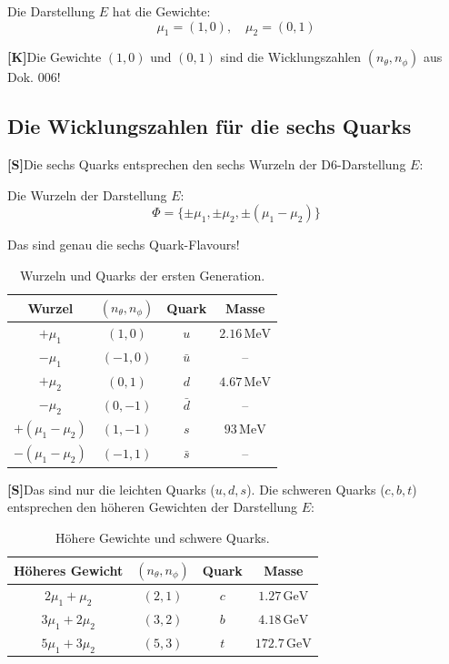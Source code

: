 \documentclass[11pt,a4paper]{article}
\newcommand{\Kstatus}{\textbf{[K]}}
\newcommand{\Sstatus}{\textbf{[S]}}
\begin{document}
	Die Darstellung $E$ hat die Gewichte:
	\begin{equation}
		\mu_1 = (1, 0), \quad \mu_2 = (0, 1)
	\end{equation}
	
	\Kstatus Die Gewichte $(1, 0)$ und $(0, 1)$ sind die Wicklungszahlen $(n_\theta, n_\phi)$ aus Dok. 006!
	
	\subsection{Die Wicklungszahlen für die sechs Quarks}
	
	\Sstatus Die sechs Quarks entsprechen den sechs Wurzeln der D6-Darstellung $E$:
	
	Die Wurzeln der Darstellung $E$:
	\begin{equation}
		\Phi = \{\pm \mu_1, \pm \mu_2, \pm (\mu_1 - \mu_2)\}
	\end{equation}
	
	Das sind genau die sechs Quark-Flavours!
	
	\begin{table}[h!]
		\centering
		\caption{Wurzeln und Quarks der ersten Generation.}
		\label{tab:roots_quarks}
		\begin{tabular}{c c c c}
			\toprule
			\textbf{Wurzel} & $(n_\theta, n_\phi)$ & \textbf{Quark} & \textbf{Masse} \\
			\midrule
			$+\mu_1$ & $(1, 0)$ & $u$ & $2.16\,\text{MeV}$ \\
			$-\mu_1$ & $(-1, 0)$ & $\bar{u}$ & -- \\
			$+\mu_2$ & $(0, 1)$ & $d$ & $4.67\,\text{MeV}$ \\
			$-\mu_2$ & $(0, -1)$ & $\bar{d}$ & -- \\
			$+(\mu_1 - \mu_2)$ & $(1, -1)$ & $s$ & $93\,\text{MeV}$ \\
			$-(\mu_1 - \mu_2)$ & $(-1, 1)$ & $\bar{s}$ & -- \\
			\bottomrule
		\end{tabular}
	\end{table}
	
	\Sstatus Das sind nur die leichten Quarks ($u, d, s$). Die schweren Quarks ($c, b, t$) entsprechen den höheren Gewichten der Darstellung $E$:
	
	\begin{table}[h!]
		\centering
		\caption{Höhere Gewichte und schwere Quarks.}
		\label{tab:heavy_quarks}
		\begin{tabular}{c c c c}
			\toprule
			\textbf{Höheres Gewicht} & $(n_\theta, n_\phi)$ & \textbf{Quark} & \textbf{Masse} \\
			\midrule
			$2\mu_1 + \mu_2$ & $(2, 1)$ & $c$ & $1.27\,\text{GeV}$ \\
			$3\mu_1 + 2\mu_2$ & $(3, 2)$ & $b$ & $4.18\,\text{GeV}$ \\
			$5\mu_1 + 3\mu_2$ & $(5, 3)$ & $t$ & $172.7\,\text{GeV}$ \\
			\bottomrule
		\end{tabular}
	\end{table}
	
\end{document}
